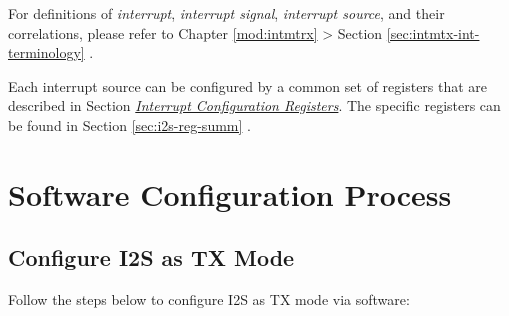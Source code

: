 \documentclass[main\_\_EN.tex]{subfiles}
\begin{document}
\begin{tiplisting}
For definitions of \textit{interrupt}, \textit{interrupt signal}, \textit{interrupt source}, and their correlations, please refer to Chapter \ref{mod:intmtrx} \textit{} > Section \ref{sec:intmtx-int-terminology} \textit{}.
\end{tiplisting}

Each interrupt source can be configured by a common set of registers that are described in Section \hyperref[interrupt-config-registers]{\textit{Interrupt Configuration Registers}}. The specific registers can be found in Section \ref{sec:i2s-reg-summ} \textit{}.

\section{Software Configuration Process}
\subsection{Configure I2S as TX Mode}\label{sec:i2s-configure-i2s-tx-mode}
Follow the steps below to configure I2S as TX mode via software:
\end{document}
